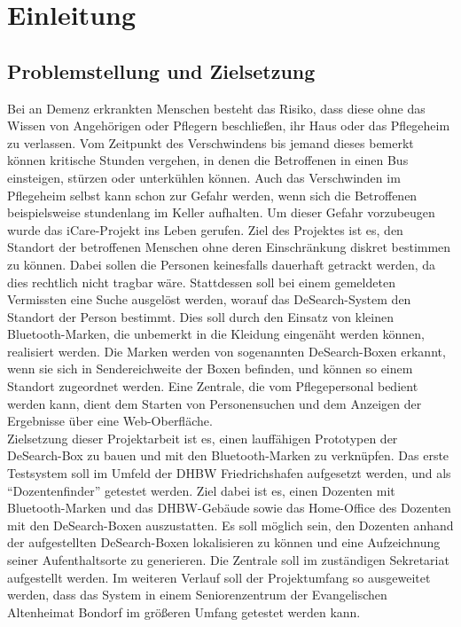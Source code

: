 
\section{Einleitung}


\subsection{Problemstellung und Zielsetzung}
Bei an Demenz erkrankten Menschen besteht das Risiko, dass diese ohne das Wissen von Angehörigen oder Pflegern beschließen, ihr Haus oder das Pflegeheim zu verlassen. Vom Zeitpunkt des Verschwindens bis jemand dieses bemerkt können kritische Stunden vergehen, in denen die Betroffenen in einen Bus einsteigen, stürzen oder unterkühlen können. Auch das Verschwinden im Pflegeheim selbst kann schon zur Gefahr werden, wenn sich die Betroffenen beispielsweise stundenlang im Keller aufhalten. Um dieser Gefahr vorzubeugen wurde das iCare-Projekt ins Leben gerufen. Ziel des Projektes ist es, den Standort der betroffenen Menschen ohne deren Einschränkung diskret bestimmen zu können. Dabei sollen die Personen keinesfalls dauerhaft getrackt werden, da dies rechtlich nicht tragbar wäre. Stattdessen soll bei einem gemeldeten Vermissten eine Suche ausgelöst werden, worauf das DeSearch-System den Standort der Person bestimmt. Dies soll durch den Einsatz von kleinen Bluetooth-Marken, die unbemerkt in die Kleidung eingenäht werden können, realisiert werden. Die Marken werden von sogenannten DeSearch-Boxen erkannt, wenn sie sich in Sendereichweite der Boxen befinden, und können so einem Standort zugeordnet werden. Eine Zentrale, die vom Pflegepersonal bedient werden kann, dient dem Starten von Personensuchen und dem Anzeigen der Ergebnisse über eine Web-Oberfläche.
\\Zielsetzung dieser Projektarbeit ist es, einen lauffähigen Prototypen der DeSearch-Box zu bauen und mit den Bluetooth-Marken zu verknüpfen. Das erste Testsystem soll im Umfeld der DHBW Friedrichshafen aufgesetzt werden, und als “Dozentenfinder” getestet werden. Ziel dabei ist es, einen Dozenten mit Bluetooth-Marken und das DHBW-Gebäude sowie das Home-Office des Dozenten mit den DeSearch-Boxen auszustatten. Es soll möglich sein, den Dozenten anhand der aufgestellten DeSearch-Boxen lokalisieren zu können und eine Aufzeichnung seiner Aufenthaltsorte zu generieren. Die Zentrale soll im zuständigen Sekretariat aufgestellt werden.
Im weiteren Verlauf soll der Projektumfang so ausgeweitet werden, dass das System in einem Seniorenzentrum der Evangelischen Altenheimat Bondorf im größeren Umfang getestet werden kann.




